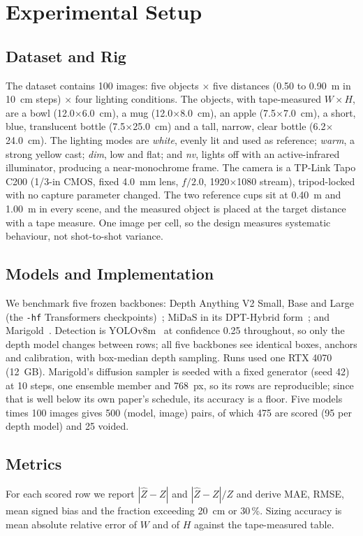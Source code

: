 \documentclass[conference]{IEEEtran}
\begin{document}
\section{Experimental Setup}
\label{sec:setup}

\subsection{Dataset and Rig}
The dataset contains 100 images: five objects $\times$ five distances (0.50 to
0.90~m in 10~cm steps) $\times$ four lighting conditions. The objects, with
tape-measured $W\times H$, are a bowl (12.0$\times$6.0~cm), a mug
(12.0$\times$8.0~cm), an apple (7.5$\times$7.0~cm), a short, blue,
translucent bottle (7.5$\times$25.0~cm) and a tall, narrow, clear
bottle (6.2$\times$24.0~cm). The lighting modes are \emph{white}, evenly lit and used as
reference; \emph{warm}, a strong yellow cast; \emph{dim}, low and flat; and
\emph{nv}, lights off with an active-infrared illuminator, producing a
near-monochrome frame. The camera is a TP-Link Tapo C200 (1/3-in
CMOS, fixed 4.0~mm lens, $f/2.0$, 1920$\times$1080 stream), tripod-locked with
no capture parameter changed. The two reference cups sit at 0.40~m and 1.00~m in
every scene, and the measured object is placed at the target distance with a
tape measure. One image
per cell, so the design measures systematic behaviour, not shot-to-shot
variance.

\subsection{Models and Implementation}
We benchmark five frozen backbones: Depth Anything V2 Small, Base and Large (the
\texttt{-hf} Transformers checkpoints)~\cite{yang2024dav2}; MiDaS in its
DPT-Hybrid form~\cite{ranftl2022midas,ranftl2021dpt}; and
Marigold~\cite{ke2024marigold}. Detection is YOLOv8m~\cite{jocher2023yolov8} at
confidence 0.25 throughout, so only the depth model changes between rows; all
five backbones see identical boxes, anchors and calibration, with box-median
depth sampling. Runs used one RTX 4070 (12~GB).
Marigold's diffusion sampler is seeded with a fixed generator (seed 42) at 10
steps, one ensemble member and 768~px, so its rows are reproducible; since that
is well below its own paper's schedule, its accuracy is a floor.
Five models times 100 images gives 500 (model, image) pairs, of which 475 are
scored (95 per depth model) and 25 voided.

\subsection{Metrics}
For each scored row we report $|\hat Z - Z|$ and $|\hat Z - Z|/Z$ and derive MAE,
RMSE, mean signed bias and the fraction exceeding 20~cm or 30\,\%. Sizing accuracy is mean absolute relative error of $W$ and of $H$ against
the tape-measured table.
\end{document}
